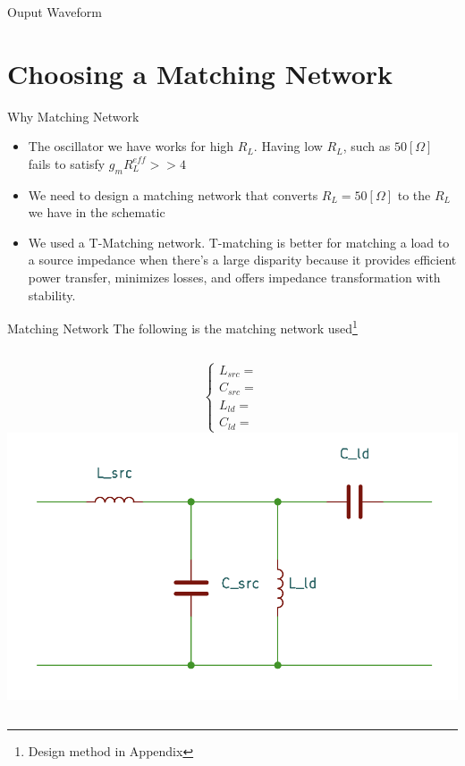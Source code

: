 \documentclass{beamer}
\begin{document}
\begin{frame}{Ouput Waveform}


\end{frame}



\section{Choosing a Matching Network}

\begin{frame}{Why Matching Network}
  \begin{itemize}
    \item <1-> The oscillator we have works for high \(R_L\). Having low \(R_L\), such as \(50[\Omega]\) fails to satisfy \(g_{m}R_L^{eff} >> 4\)
    \item <2-> We need to design a matching network that converts \(R_L = 50[\Omega]\) to the \(R_L\) we have in the schematic
    \item <3-> We used a T-Matching network. T-matching is better for matching a load to a source impedance when there's a large disparity because it provides efficient power transfer, minimizes losses, and offers impedance transformation with stability.
  \end{itemize}
\end{frame}

\begin{frame}{Matching Network}
The following is the matching network used\footnote{Design method in Appendix}
\begin{columns}
  \begin{equation*}
    \begin{cases}
      L_{src} = \\
      C_{src} = \\
      L_{ld} = \\
      C_{ld} = 
    \end{cases}
  \end{equation*}
  \includegraphics[width = \linewidth]{images/matching_network.png}
\end{columns}
  
\end{frame}
\end{document}
